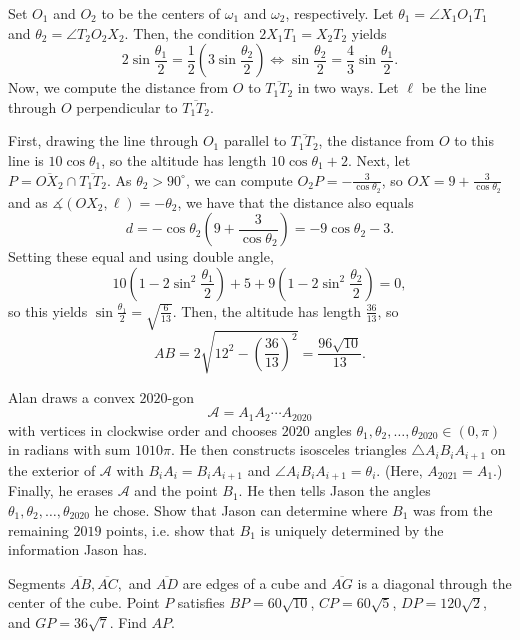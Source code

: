 \documentclass[11pt]{article}
\theoremstyle{definition}
\begin{document}
\begin{solution}[name={Solution by HamstPan38825}]
	Set $O_1$ and $O_2$ to be the centers of $\omega_1$ and $\omega_2$, respectively. Let $\theta_1 = \angle X_1O_1T_1$ and $\theta_2 = \angle T_2O_2X_2$. Then, the condition $2X_1T_1 = X_2T_2$ yields$$2\sin \frac{\theta_1}2 = \frac 12\left(3 \sin \frac{\theta_2}2\right) \iff \sin \frac{\theta_2}2 = \frac 43 \sin \frac{\theta_1}2.$$Now, we compute the distance from $O$ to $\overline{T_1T_2}$ in two ways. Let $\ell$ be the line through $O$ perpendicular to $\overline{T_1T_2}$.
	
	First, drawing the line through $O_1$ parallel to $\overline{T_1T_2}$, the distance from $O$ to this line is $10 \cos \theta_1$, so the altitude has length $10\cos\theta_1 + 2$. Next, let $P = \overline{OX_2} \cap \overline{T_1T_2}$. As $\theta_2 > 90^\circ$, we can compute $O_2P = -\frac 3{\cos \theta_2}$, so $OX = 9+\frac 3{\cos \theta_2}$ and as $\measuredangle(OX_2, \ell) = -\theta_2$, we have that the distance also equals$$d = -\cos \theta_2\left(9+\frac 3{\cos \theta_2}\right) = -9\cos\theta_2 - 3.$$Setting these equal and using double angle,$$10\left(1-2\sin^2 \frac{\theta_1}2\right) + 5 + 9\left(1-2\sin^2 \frac{\theta_2}2\right) = 0,$$so this yields $\sin \frac{\theta_1}2 = \sqrt{\frac 6{13}}$. Then, the altitude has length $\frac{36}{13}$, so$$AB = 2\sqrt{12^2 - \left(\frac{36}{13}\right)^2} = \boxed{\frac{96\sqrt{10}}{13}}.$$
\end{solution}



\begin{question}[name={2020 HMMT, Team, \href{https://artofproblemsolving.com/community/c129h2008281p14065369}{Problem 4}}]
	Alan draws a convex $2020$-gon $$\mathcal{A}=A_1A_2\dotsm A_{2020}$$ with vertices in clockwise order and chooses $2020$ angles $\theta_1, \theta_2, \dotsc, \theta_{2020}\in (0, \pi)$ in radians with sum $1010\pi$. He then constructs isosceles triangles $\triangle A_iB_iA_{i+1}$ on the exterior of $\mathcal{A}$ with $B_iA_i=B_iA_{i+1}$ and $\angle A_iB_iA_{i+1}=\theta_i$. (Here, $A_{2021}=A_1$.) Finally, he erases $\mathcal{A}$ and the point $B_1$. He then tells Jason the angles $\theta_1, \theta_2, \dotsc, \theta_{2020}$ he chose. Show that Jason can determine where $B_1$ was from the remaining $2019$ points, i.e. show that $B_1$ is uniquely determined by the information Jason has.
\end{question}




\begin{question}[name={2021 AIME I, \href{https://artofproblemsolving.com/community/c4p20872458}{Problem 6}}]
	Segments $\overline{AB}, \overline{AC},$ and $\overline{AD}$ are edges of a cube and $\overline{AG}$ is a diagonal through the center of the cube. Point $P$ satisfies $BP=60\sqrt{10}$, $CP=60\sqrt{5}$, $DP=120\sqrt{2}$, and $GP=36\sqrt{7}$. Find $AP.$	
\end{question}
\end{document}
